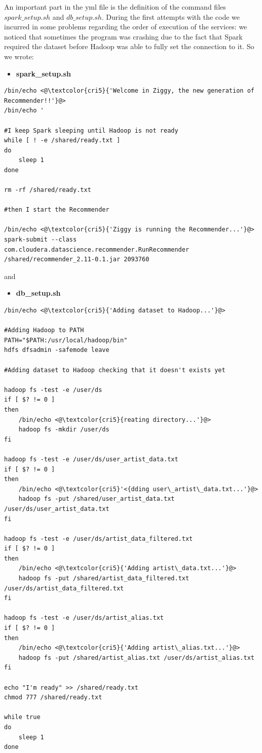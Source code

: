 \documentclass[11pt,a4paper,titlepage]{article}
\begin{document}
An important part in the yml file is the definition of the command files $spark\_setup.sh$ and $db\_setup.sh$. During the first attempts with the code we incurred in some problems regarding the order of execution of the services: we noticed that sometimes the program was crashing due to the fact that Spark required the dataset before Hadoop was able to fully set the connection to it. So we wrote:
\begin{itemize}
\item \textbf{spark\_setup.sh}
\end{itemize}
\begin{lstlisting}[style=myBashstyle]
/bin/echo <@\textcolor{cri5}{'Welcome in Ziggy, the new generation of Recommender!!'}@>
/bin/echo '

#I keep Spark sleeping until Hadoop is not ready
while [ ! -e /shared/ready.txt ]
do
    sleep 1
done

rm -rf /shared/ready.txt

#then I start the Recommender

/bin/echo <@\textcolor{cri5}{'Ziggy is running the Recommender...'}@>
spark-submit --class com.cloudera.datascience.recommender.RunRecommender /shared/recommender_2.11-0.1.jar 2093760
\end{lstlisting}
and
\begin{itemize}
\item \textbf{db\_setup.sh}
\end{itemize}
\begin{lstlisting}[style=myBashstyle]
/bin/echo <@\textcolor{cri5}{'Adding dataset to Hadoop...'}@>

#Adding Hadoop to PATH
PATH="$PATH:/usr/local/hadoop/bin"
hdfs dfsadmin -safemode leave

#Adding dataset to Hadoop checking that it doesn't exists yet

hadoop fs -test -e /user/ds
if [ $? != 0 ]
then
    /bin/echo <@\textcolor{cri5}{reating directory...'}@>
    hadoop fs -mkdir /user/ds
fi

hadoop fs -test -e /user/ds/user_artist_data.txt
if [ $? != 0 ]
then
    /bin/echo <@\textcolor{cri5}'<{dding user\_artist\_data.txt...'}@>
    hadoop fs -put /shared/user_artist_data.txt /user/ds/user_artist_data.txt
fi

hadoop fs -test -e /user/ds/artist_data_filtered.txt
if [ $? != 0 ]
then
    /bin/echo <@\textcolor{cri5}{'Adding artist\_data.txt...'}@>
    hadoop fs -put /shared/artist_data_filtered.txt /user/ds/artist_data_filtered.txt
fi

hadoop fs -test -e /user/ds/artist_alias.txt
if [ $? != 0 ]
then
    /bin/echo <@\textcolor{cri5}{'Adding artist\_alias.txt...'}@>
    hadoop fs -put /shared/artist_alias.txt /user/ds/artist_alias.txt
fi

echo "I'm ready" >> /shared/ready.txt
chmod 777 /shared/ready.txt

while true
do
    sleep 1
done
\end{lstlisting}
\end{document}
